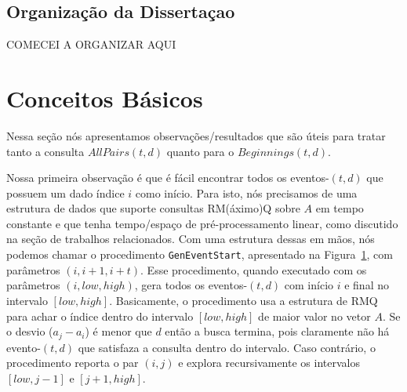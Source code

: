 \documentclass[12pt]{article}
\begin{document}
\subsection{Organização da Dissertaçao}
COMECEI A ORGANIZAR AQUI 
\section{Conceitos Básicos}

Nessa seção nós apresentamos observações/resultados que são úteis para tratar
tanto a consulta $AllPairs(t, d)$ quanto para o $Beginnings(t, d)$.

Nossa primeira observação é que é fácil encontrar todos os eventos-$(t,d)$ que possuem
um dado índice $i$ como início. Para isto, nós precisamos de uma estrutura de dados que
suporte consultas RM(áximo)Q sobre $A$ em tempo constante e que tenha tempo/espaço de pré-processamento linear,
como discutido na seção de trabalhos relacionados. Com uma estrutura dessas em mãos, nós podemos
chamar o procedimento {\tt GenEventStart}, apresentado na Figura~\ref{geneventstart}, com parâmetros
$(i, i + 1, i + t)$. Esse procedimento, quando executado com os parâmetros $(i, low, high)$, gera
todos os eventos-$(t,d)$ com início $i$ e final no intervalo $[low, high]$. Basicamente, o procedimento
usa a estrutura de RMQ para achar o índice dentro do intervalo $[low, high]$ de maior valor no 
vetor $A$. Se o desvio ($a_j - a_i$) é menor que $d$ então a busca termina, pois claramente não
há evento-$(t,d)$ que satisfaza a consulta dentro do intervalo. Caso contrário, o procedimento reporta
o par $(i, j)$ e explora recursivamente os intervalos $[low, j - 1]$ e $[j + 1, high]$.
 
\begin{figure}
\label{geneventstart}
\end{figure}
\end{document}
